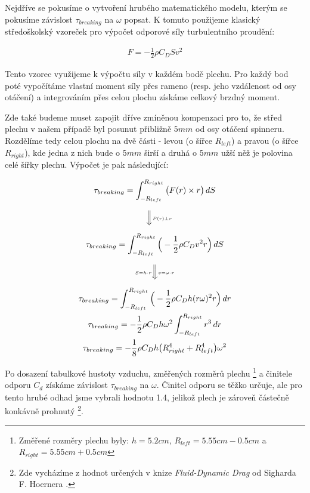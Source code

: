 Nejdříve se pokusíme o vytvoření hrubého matematického modelu, kterým se pokusíme závislost $\tau_{breaking}$ na $\omega$ popsat. K tomuto použijeme klasický středoškolský vzoreček pro výpočet odporové síly turbulentního proudění:

\begin{equation}
    \label{eq:highschool_drag}
    \begin{gathered}
        F = -\frac{1}{2} \rho C_D S v^2
    \end{gathered}
\end{equation}

\clearpage

Tento vzorec využijeme k výpočtu síly v každém bodě plechu. Pro každý bod poté vypočítáme vlastní moment síly přes rameno (resp. jeho vzdálenost od osy otáčení) a integrováním přes celou plochu získáme celkový brzdný moment.

Zde také budeme muset zapojit dříve zmíněnou kompenzaci pro to, že střed plechu v našem případě byl posunut přibližně $5mm$ od osy otáčení spinneru. Rozdělíme tedy celou plochu na dvě části - levou (o šířce $R_{left}$) a pravou (o šířce $R_{right}$), kde jedna z nich bude o $5mm$ širší a druhá o $5mm$ užší něž je polovina celé šířky plechu. Výpočet je pak následující:

\begin{equation}
    \label{eq:breaking_torque}
    \begin{gathered}
        \tau_{breaking} = \int_{-R_{left}}^{R_{right}} \big( F(r) \times r \big) \,dS \\
        \quad \Big\Downarrow \scriptscriptstyle{F(r) \perp r} \vphantom{\Bigg(} \\
        \tau_{breaking} = \int_{-R_{left}}^{R_{right}} \Big( -\frac{1}{2} \rho C_D v^2 r \Big) \,dS \\
        \scriptscriptstyle{S = h \cdot r} \Big\Downarrow \scriptscriptstyle{v = \omega \cdot r} \vphantom{\Bigg(} \\
        \tau_{breaking} = \int_{-R_{left}}^{R_{right}} \Big( -\frac{1}{2} \rho C_D h (r \omega)^2 r \Big) \,dr \\
        \tau_{breaking} = -\frac{1}{2} \rho C_D h \omega^2 \int_{-R_{left}}^{R_{right}} r^3 \,dr \\
        \tau_{breaking} = -\frac{1}{8} \rho C_D h \big( R_{right}^4 + R_{left}^4 \big) \omega^2
    \end{gathered}
\end{equation}

Po dosazení tabulkové hustoty vzduchu, změřených rozměrů plechu \footnote{Změřené rozměry plechu byly: $h = 5.2cm$, $R_{left} = 5.55cm - 0.5cm$ a $R_{right} = 5.55cm + 0.5cm$} a činitele odporu $C_d$ získáme závislost $\tau_{breaking}$ na $\omega$. Činitel odporu se těžko určuje, ale pro tento hrubé odhad jsme vybrali hodnotu 1.4, jelikož plech je zároveň částečně konkávně prohnutý \footnote{Zde vycházíme z hodnot určených v knize \textit{Fluid-Dynamic Drag} od Sigharda F. Hoernera \cite{plate_drag_coef}.}.

